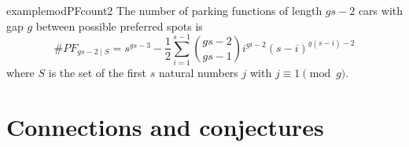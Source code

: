 \documentclass[12 pt]{amsart}
\theoremstyle{definition} %
\theoremstyle{remark} %
\begin{document}
\begin{restatable}{example}{modPFcount2}
	The number of parking functions of length $gs - 2$ cars with gap $g$ between possible preferred spots is
	\[
		\#PF_{gs - 2 \mid S} = s^{gs - 3} - \frac{1}{2} \sum_{i = 1}^{s - 1} \binom{gs - 2}{gs - 1} i^{gi - 2} (s - i)^{g(s - i) - 2}
	\]
	where $S$ is the set of the first $s$ natural numbers $j$ with $j \equiv 1 \pmod g$.
\end{restatable}

\section{Connections and conjectures}



\end{document}
